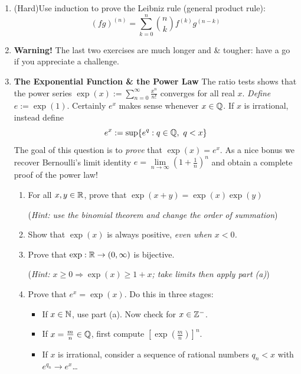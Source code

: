\begin{exercises}{}
\begin{enumerate}
	
   	\item (Hard)\lstsp Use induction to prove the Leibniz rule (general product rule):
   	\[
   		(fg)^{(n)}=\sum_{k=0}^n\binom nk f^{(k)}g^{(n-k)}
   	\]
   
   	\goodbreak
   	
   	\item[]\textbf{Warning!} The last two exercises are much longer and \& tougher: have a go if you appreciate a challenge.
   	
   	\item\label{exs:expmasochist} \textbf{The Exponential Function \& the Power Law}\smallbreak
    	The ratio tests shows that the power series $\exp(x):=\sum_{n=0}^\infty\frac{x^n}{n!}$ converges for all real $x$. 
		\emph{Define} $e:=\exp(1)$. Certainly $e^x$ makes sense whenever $x\in\mathbb{Q}$. If $x$ is irrational, instead define
	  \[
	  	e^x:=\sup\{e^q:q\in\mathbb{Q},\ q< x\}
	  \]
		The goal of this question is to \emph{prove} that $\exp(x)=e^x$. As a nice bonus we recover Bernoulli's limit identity $e=\lim\limits_{n\to\infty}\left(1+\frac 1n\right)^n$ and obtain a complete proof of the power law!
	  \begin{enumerate}
	    \item For all $x,y\in\mathbb{R}$, prove that $\exp(x+y)=\exp(x)\exp(y)$\par
	    (\emph{Hint: use the binomial theorem and change the order of summation})
	    
	    \item Show that $\exp(x)$ is always positive, \emph{even when $x<0$.}
	    
	    \item Prove that $\exp:\mathbb{R}\to (0,\infty)$ is bijective.\par
	    (\emph{Hint: $x\ge 0\Longrightarrow \exp(x)\ge 1+x$; take limits then apply part (a)})
	    
	    \item Prove that $e^x=\exp(x)$. Do this in three stages:
	    \begin{itemize}
	      \item If $x\in\mathbb{N}$, use part (a). Now check for $x\in\mathbb{Z}^-$.
	      \item If $x=\frac mn\in\mathbb{Q}$, first compute $\left[\exp(\frac mn)\right]^n$.
	      \item If $x$ is irrational, consider a sequence of rational numbers $q_n<x$ with $e^{q_n}\to e^x$\ldots
	    \end{itemize}
	

\end{enumerate}
\end{enumerate}
\end{exercises}
